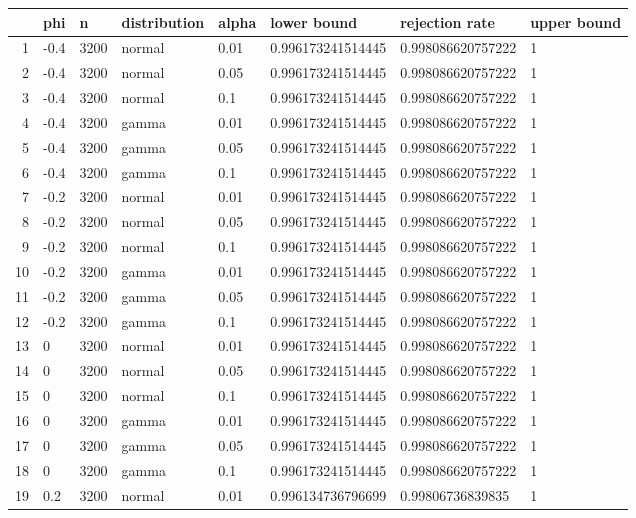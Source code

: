 \begin{table}[ht]
\centering
\begin{tabular}{rlllllll}
  \hline
 & phi & n & distribution & alpha & lower bound & rejection rate & upper bound \\ 
  \hline
1 & -0.4 & 3200 & normal & 0.01 & 0.996173241514445 & 0.998086620757222 & 1 \\ 
  2 & -0.4 & 3200 & normal & 0.05 & 0.996173241514445 & 0.998086620757222 & 1 \\ 
  3 & -0.4 & 3200 & normal & 0.1 & 0.996173241514445 & 0.998086620757222 & 1 \\ 
  4 & -0.4 & 3200 & gamma & 0.01 & 0.996173241514445 & 0.998086620757222 & 1 \\ 
  5 & -0.4 & 3200 & gamma & 0.05 & 0.996173241514445 & 0.998086620757222 & 1 \\ 
  6 & -0.4 & 3200 & gamma & 0.1 & 0.996173241514445 & 0.998086620757222 & 1 \\ 
  7 & -0.2 & 3200 & normal & 0.01 & 0.996173241514445 & 0.998086620757222 & 1 \\ 
  8 & -0.2 & 3200 & normal & 0.05 & 0.996173241514445 & 0.998086620757222 & 1 \\ 
  9 & -0.2 & 3200 & normal & 0.1 & 0.996173241514445 & 0.998086620757222 & 1 \\ 
  10 & -0.2 & 3200 & gamma & 0.01 & 0.996173241514445 & 0.998086620757222 & 1 \\ 
  11 & -0.2 & 3200 & gamma & 0.05 & 0.996173241514445 & 0.998086620757222 & 1 \\ 
  12 & -0.2 & 3200 & gamma & 0.1 & 0.996173241514445 & 0.998086620757222 & 1 \\ 
  13 & 0 & 3200 & normal & 0.01 & 0.996173241514445 & 0.998086620757222 & 1 \\ 
  14 & 0 & 3200 & normal & 0.05 & 0.996173241514445 & 0.998086620757222 & 1 \\ 
  15 & 0 & 3200 & normal & 0.1 & 0.996173241514445 & 0.998086620757222 & 1 \\ 
  16 & 0 & 3200 & gamma & 0.01 & 0.996173241514445 & 0.998086620757222 & 1 \\ 
  17 & 0 & 3200 & gamma & 0.05 & 0.996173241514445 & 0.998086620757222 & 1 \\ 
  18 & 0 & 3200 & gamma & 0.1 & 0.996173241514445 & 0.998086620757222 & 1 \\ 
  19 & 0.2 & 3200 & normal & 0.01 & 0.996134736796699 & 0.99806736839835 & 1 \\ 

\end{tabular}
\end{table}

